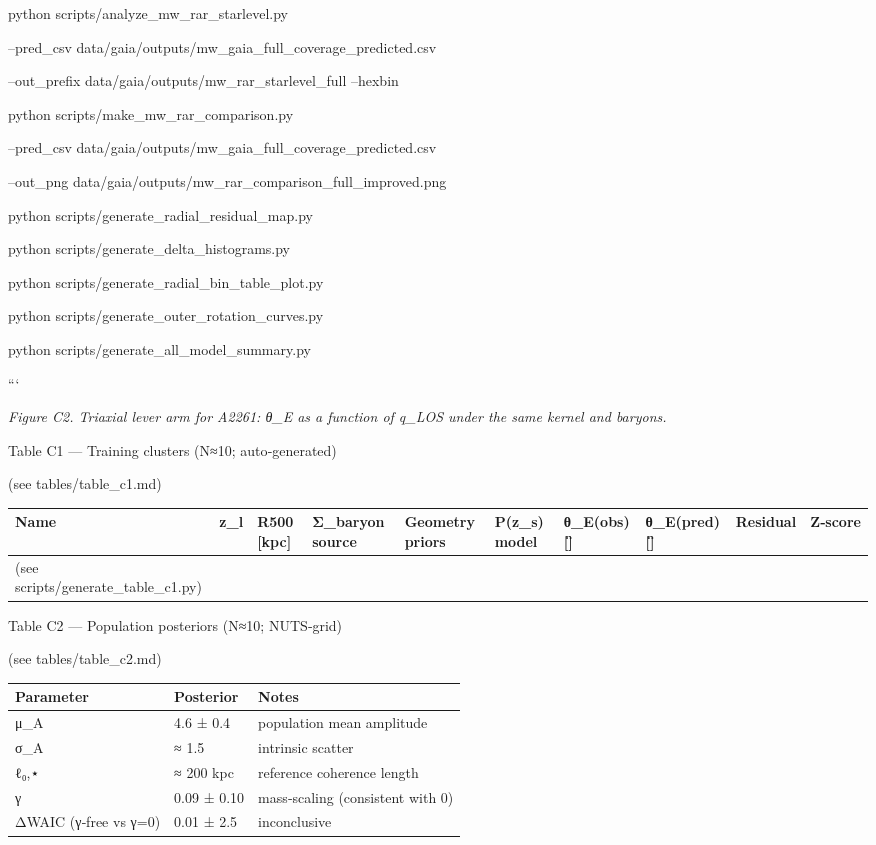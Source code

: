 \documentclass[11pt,a4paper]{article}
\begin{document}
python scripts/analyze\_mw\_rar\_starlevel.py \

  --pred\_csv data/gaia/outputs/mw\_gaia\_full\_coverage\_predicted.csv \

  --out\_prefix data/gaia/outputs/mw\_rar\_starlevel\_full --hexbin


python scripts/make\_mw\_rar\_comparison.py \

  --pred\_csv data/gaia/outputs/mw\_gaia\_full\_coverage\_predicted.csv \

  --out\_png data/gaia/outputs/mw\_rar\_comparison\_full\_improved.png


python scripts/generate\_radial\_residual\_map.py

python scripts/generate\_delta\_histograms.py

python scripts/generate\_radial\_bin\_table\_plot.py

python scripts/generate\_outer\_rotation\_curves.py

python scripts/generate\_all\_model\_summary.py

```


\textit{Figure C2. Triaxial lever arm for A2261: θ\_E as a function of q\_LOS under the same kernel and baryons.}


Table C1 — Training clusters (N≈10; auto‑generated)

(see tables/table\_c1.md)


\begin{table}[h]
\centering
\begin{tabular}{llllllllll}
\toprule
Name & z\_l & R500 [kpc] & Σ\_baryon source & Geometry priors & P(z\_s) model & θ\_E(obs) [\"] & θ\_E(pred) [\"] & Residual & Z‑score \\
\midrule
(see scripts/generate\_table\_c1.py) \\
\bottomrule
\end{tabular}
\end{table}


Table C2 — Population posteriors (N≈10; NUTS‑grid)

(see tables/table\_c2.md)


\begin{table}[h]
\centering
\begin{tabular}{lll}
\toprule
Parameter & Posterior & Notes \\
\midrule
μ\_A & 4.6 ± 0.4 & population mean amplitude \\
σ\_A & ≈ 1.5 & intrinsic scatter \\
ℓ₀,⋆ & ≈ 200 kpc & reference coherence length \\
γ & 0.09 ± 0.10 & mass‑scaling (consistent with 0) \\
ΔWAIC (γ‑free vs γ=0) & 0.01 ± 2.5 & inconclusive \\
\bottomrule
\end{tabular}
\end{table}
\end{document}
